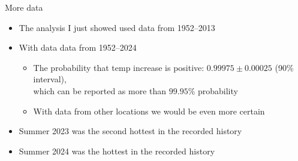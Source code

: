 \documentclass[english,t]{beamer}
\begin{document}
\begin{frame}{More data}

  \vspace{-0.75\baselineskip}
  \begin{itemize}
  \item<1-> The analysis I just showed used data from 1952--2013
  \item<2-> With data data from 1952--2024
    \begin{itemize}
    \item The probability that temp increase is positive:
      $0.99975 \pm 0.00025$ (90\% interval),\\ which can be reported as more than
      $99.95\%$ probability
    \item With data from other locations we would be even more certain
    \end{itemize}
  \item<3-> Summer 2023 was the second hottest in the recorded history
  \item<3-> Summer 2024 was the hottest in the recorded history
  \end{itemize}
  \vspace{-0.5\baselineskip}
  
\end{frame}
\end{document}

